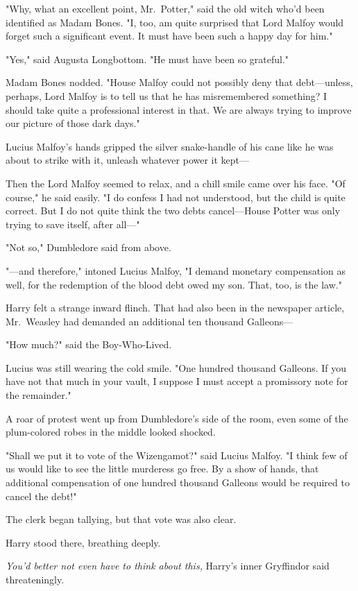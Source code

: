 "Why, what an excellent point, Mr.~Potter," said the old witch who'd been 
identified as Madam Bones. "I, too, am quite surprised that Lord Malfoy would 
forget such a significant event. It must have been such a happy day for him."

"Yes," said Augusta Longbottom. "He must have been so grateful."

Madam Bones nodded. "House Malfoy could not possibly deny that debt---unless, 
perhaps, Lord Malfoy is to tell us that he has misremembered something? I 
should take quite a professional interest in that. We are always trying to 
improve our picture of those dark days."

Lucius Malfoy's hands gripped the silver snake-handle of his cane like he was 
about to strike with it, unleash whatever power it kept---

Then the Lord Malfoy seemed to relax, and a chill smile came over his face. "Of 
course," he said easily. "I do confess I had not understood, but the child is 
quite correct. But I do not quite think the two debts cancel---House Potter was 
only trying to save itself, after all---"

"Not so," Dumbledore said from above.

"---and therefore," intoned Lucius Malfoy, "I demand monetary compensation as 
well, for the redemption of the blood debt owed my son. That, too, is the law."

Harry felt a strange inward flinch. That had also been in the newspaper 
article, Mr.~Weasley had demanded an additional ten thousand Galleons---

"How much?" said the Boy-Who-Lived.

Lucius was still wearing the cold smile. "One hundred thousand Galleons. If you 
have not that much in your vault, I suppose I must accept a promissory note for 
the remainder."

A roar of protest went up from Dumbledore's side of the room, even some of the 
plum-colored robes in the middle looked shocked.

"Shall we put it to vote of the Wizengamot?" said Lucius Malfoy. "I think few 
of us would like to see the little murderess go free. By a show of hands, that 
additional compensation of one hundred thousand Galleons would be required to 
cancel the debt!"

The clerk began tallying, but that vote was also clear.

Harry stood there, breathing deeply.

\emph{You'd better not even have to think about this,} Harry's inner Gryffindor 
said threateningly.

